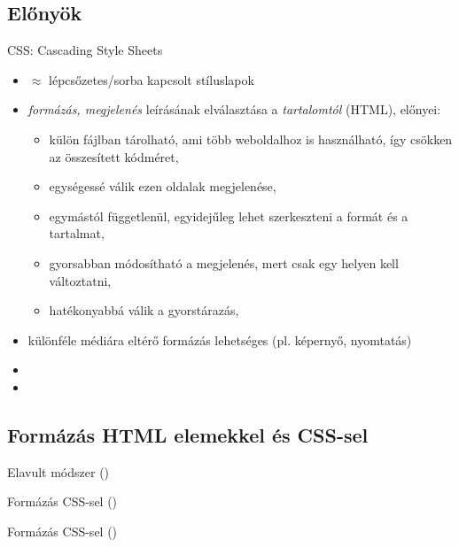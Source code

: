 \subsection{Előnyök}

\begin{frame}
  CSS: Cascading Style Sheets
  \begin{itemize}
    \item $\approx$ lépcsőzetes/sorba kapcsolt stíluslapok
    \item \emph{formázás, megjelenés} leírásának elválasztása a \emph{tartalomtól} (HTML), előnyei:
    \begin{itemize}
      \item külön fájlban tárolható, ami több weboldalhoz is használható, így csökken az összesített kódméret, 
      \item egységessé válik ezen oldalak megjelenése,
      \item egymástól függetlenül, egyidejűleg lehet szerkeszteni a formát és a tartalmat,
      \item gyorsabban módosítható a megjelenés, mert csak egy helyen kell változtatni,
      \item hatékonyabbá válik a gyorstárazás,
    \end{itemize}
    \item különféle médiára eltérő formázás lehetséges (pl. képernyő, nyomtatás)
    \item {}
    \item {}
  \end{itemize}
\end{frame}

\subsection{Formázás HTML elemekkel és CSS-sel}

\begin{frame}
  \small
  \begin{alertblock}{Elavult módszer ()}
    
  \end{alertblock}
\end{frame}

\begin{frame}
  \scriptsize
  \begin{exampleblock}{Formázás CSS-sel ()}
    
  \end{exampleblock}
  \begin{exampleblock}{Formázás CSS-sel ()}
    
  \end{exampleblock}
\end{frame}

